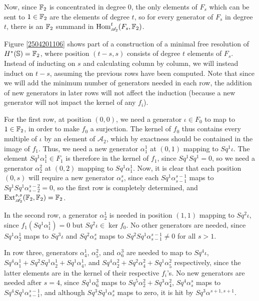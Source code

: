 \documentclass[11pt, titlepage]{article} %
\def\bb{\ensuremath\mathbb}
\def\A{\ensuremath{\mathscr{A}_2}}
\DeclareMathOperator{\Ext}{Ext}
\DeclareMathOperator{\Hom}{Hom}
\numberwithin{equation}{subsection}
\theoremstyle{plain}
\theoremstyle{definition}
\begin{document}
Now, since \(\bb{F}_2\) is concentrated in degree 0, the only elements of \(F_s\) which can be sent to \(1 \in \bb{F}_2\) are the elements of degree \(t\), so for every generator of \(F_s\) in degree \(t\), there is an \(\bb{F}_2\) summand in \(\Hom^t_{\A}(F_s, \bb{F}_2)\). 

Figure \ref{2504201106} shows part of a construction of a minimal free resolution of \(H^*(\bb{S})=\bb{F}_2\), where position \((t-s, s)\) consists of degree \(t\) elements of \(F_s\).  Instead of inducting on \(s\) and calculating column by column, we will instead induct on \(t-s\), assuming the previous rows have been computed. Note that since we will add the minimum number of generators needed in each row, the addition of new generators in later rows will not affect the induction (because a new generator will not impact the kernel of any \(f_i\)). 

For the first row, at position \((0,0)\), we need a generator \(\iota\in F_0\) to map to \(1 \in \bb{F}_2\), in order to make \(f_0\) a surjection. The kernel of \(f_0\) thus contains every multiple of \(\iota\) by an element of \(\A\), which by exactness should be contained in the image of \(f_1\). Thus, we need a new generator \(\alpha^1_1\) at \((0,1)\) mapping to \(Sq^1\iota\). The element \(Sq^1\alpha^1_1\in F_1\) is therefore in the kernel of \(f_1\), since \(Sq^1Sq^1=0\), so we need a generator \(\alpha^2_2\) at \((0,2)\) mapping to \(Sq^1\alpha^1_1\). Now, it is clear that each position \((0,s)\) will require a new generator \(\alpha^s_s\), since each \(Sq^1\alpha^{s-1}_{s-1}\) maps to \(Sq^1Sq^1 \alpha^{s-2}_{s-2}=0\), so the first row is completely determined, and \(\Ext^{s,s}_{\A}(\bb{F}_2, \bb{F}_2)=\bb{F}_2\). 

In the second row, a generator \(\alpha^1_2\) is needed in position \((1,1)\) mapping to \(Sq^2\iota\), since \(f_1(Sq^1\alpha^1_1)=0\) but \(Sq^2\iota\in \ker f_0\). No other generators are needed, since \(Sq^1\alpha^1_2\) maps to \(Sq^3\iota\) and \(Sq^2\alpha^s_s\) maps to \(Sq^2Sq^1\alpha^{s-1}_{s-1}\neq 0\) for all \(s>1\).

In row three, generators \(\alpha^1_4\), \(\alpha^2_5\), and \(\alpha^3_6\) are needed to map to \(Sq^4\iota\), \(Sq^4\alpha^1_1+Sq^2Sq^1\alpha^1_2+Sq^1 \alpha^1_4\), and \(Sq^4\alpha^2_2+Sq^2\alpha^2_4+Sq^1\alpha^2_5\) respectively, since the latter elements are in the kernel of their respective \(f_i\)'s. No new generators are needed after \(s=4\), since \(Sq^1\alpha^3_6\) maps to \(Sq^5\alpha^2_2+Sq^3\alpha^2_4\), \(Sq^4\alpha^s_s\) maps to \(Sq^4Sq^1\alpha^{s-1}_{s-1}\), and although \(Sq^3Sq^1\alpha^s_s\) maps to zero, it is hit by \(Sq^3\alpha^{s+1,s+1}\). 
\end{document}
